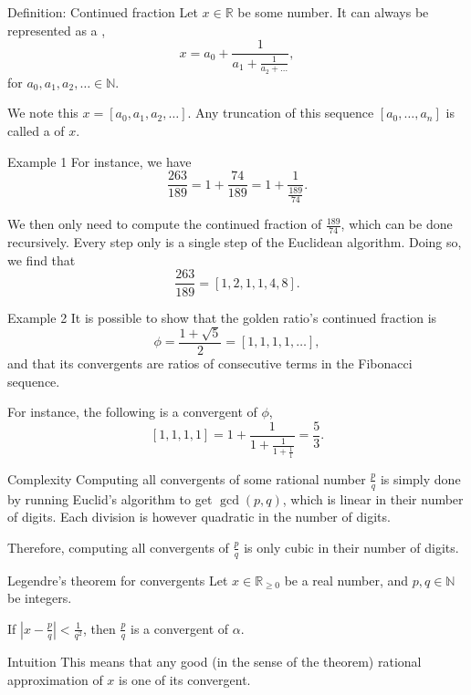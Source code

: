 \documentclass[a4paper]{article}
\begin{document}
\begin{parag}{Definition: Continued fraction}
    Let $x \in \mathbb{R}$ be some number. It can always be represented as a , 
    \[x = a_0 + \frac{1}{a_1 + \frac{1}{a_2 + \ldots}},\]
    for $a_0, a_1, a_2, \ldots \in \mathbb{N}$.

    We note this $x = \left[a_0, a_1, a_2, \ldots\right]$. Any truncation of this sequence $\left[a_0, \ldots, a_n\right]$ is called a  of $x$.

    \begin{subparag}{Example 1}
        For instance, we have
        \[\frac{263}{189} = 1 + \frac{74}{189} = 1 + \frac{1}{\frac{189}{74}}.\]

        We then only need to compute the continued fraction of $\frac{189}{74}$, which can be done recursively. Every step only is a single step of the Euclidean algorithm. Doing so, we find that 
        \[\frac{263}{189} = \left[1,2,1,1,4,8\right].\]
    \end{subparag}

    \begin{subparag}{Example 2}
        It is possible to show that the golden ratio's continued fraction is
        \[\phi = \frac{1 + \sqrt{5}}{2} = \left[1,1,1,1,\ldots\right],\]
        and that its convergents are ratios of consecutive terms in the Fibonacci sequence.

        For instance, the following is a convergent of $\phi$,
        \[\left[1, 1, 1, 1\right] = 1 + \frac{1}{1 + \frac{1}{1 + \frac{1}{1}}} = \frac{5}{3}.\]
    \end{subparag}

    \begin{subparag}{Complexity}
        Computing all convergents of some rational number $\frac{p}{q}$ is simply done by running Euclid's algorithm to get $\gcd\left(p, q\right)$, which is linear in their number of digits. Each division is however quadratic in the number of digits.

        Therefore, computing all convergents of $\frac{p}{q}$ is only cubic in their number of digits.
    \end{subparag} 
\end{parag}

\begin{parag}{Legendre's theorem for convergents}
    Let $x \in \mathbb{R}_{\geq 0}$ be a real number, and $p, q \in \mathbb{N}$ be integers.

    If $\left|x - \frac{p}{q}\right| < \frac{1}{q^2}$, then $\frac{p}{q}$ is a convergent of $\alpha$.

    \begin{subparag}{Intuition}
        This means that any good (in the sense of the theorem) rational approximation of $x$ is one of its convergent.
    \end{subparag}
\end{parag}
\end{document}
